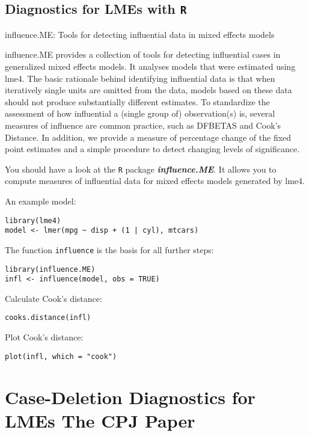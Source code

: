 \documentclass[12pt, a4paper]{article}
\theoremstyle{plain}
\theoremstyle{definition}
\theoremstyle{remark}
\begin{document}
\citet{BA83}

\subsection{Diagnostics for LMEs with \texttt{R}}
influence.ME: Tools for detecting influential data in mixed effects models

influence.ME provides a collection of tools for detecting influential cases in generalized mixed effects models. It analyses models that were estimated using lme4. The basic rationale behind identifying influential data is that when iteratively single units are omitted from the data, models based on these data should not produce substantially different estimates. To standardize the assessment of how influential a (single group of) observation(s) is, several measures of influence are common practice, such as DFBETAS and Cook's Distance. In addition, we provide a measure of percentage change of the fixed point estimates and a simple procedure to detect changing levels of significance.



You should have a look at the \texttt{R} package \textit{\textbf{influence.ME}}. It allows you to compute measures of influential data for mixed effects models generated by lme4.

An example model:
\begin{verbatim}
library(lme4)
model <- lmer(mpg ~ disp + (1 | cyl), mtcars)
\end{verbatim}

The function \texttt{influence} is the basis for all further steps:

\begin{verbatim}
library(influence.ME)
infl <- influence(model, obs = TRUE)
\end{verbatim}
Calculate Cook's distance:
\begin{verbatim}
cooks.distance(infl)
\end{verbatim}
Plot Cook's distance:
\begin{verbatim}
plot(infl, which = "cook")
\end{verbatim}
\newpage

\section{Case-Deletion Diagnostics for LMEs The CPJ Paper}%
\end{document}

